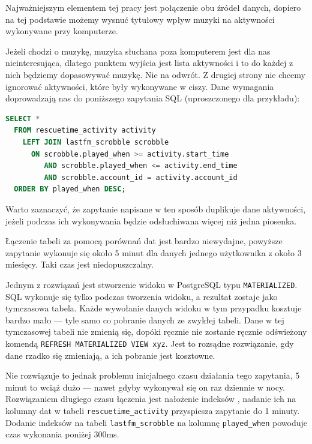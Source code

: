 \documentclass[brudnopis]{xmgr}
\begin{document}
        Najważniejszym elementem tej pracy jest połączenie obu źródeł danych,
        dopiero na tej podstawie możemy wysnuć tytułowy wpływ muzyki na aktywności wykonywane przy komputerze.

        Jeżeli chodzi o muzykę, muzyka słuchana poza komputerem jest dla nas nieinteresująca,
        dlatego punktem wyjścia jest lista aktywności i to do każdej z nich będziemy dopasowywać muzykę. Nie na odwrót.
        Z drugiej strony nie chcemy ignorować aktywności, które były wykonywane w ciszy.
        Dane wymagania doprowadzają nas do poniższego zapytania SQL (uproszczonego dla przykładu):

\begin{lstlisting}[language=sql]
SELECT *
  FROM rescuetime_activity activity
    LEFT JOIN lastfm_scrobble scrobble
      ON scrobble.played_when >= activity.start_time
         AND scrobble.played_when <= activity.end_time
         AND scrobble.account_id = activity.account_id
  ORDER BY played_when DESC;
\end{lstlisting}

        Warto zaznaczyć, że zapytanie napisane w ten sposób duplikuje dane aktywności,
        jeżeli podczas ich wykonywania będzie odsłuchiwana więcej niż jedna piosenka.

        Łączenie tabeli za pomocą porównań dat jest bardzo niewydajne,
        powyższe zapytanie wykonuje się około 5 minut dla danych jednego użytkownika z około 3 miesięcy.
        Taki czas jest niedopuszczalny.

        Jednym z rozwiązań jest stworzenie widoku w PostgreSQL typu \verb|MATERIALIZED|.
        SQL wykonuje się tylko podczas tworzenia widoku, a rezultat zostaje jako tymczasowa tabela.
        Każde wywołanie danych widoku w tym przypadku kosztuje bardzo mało --- tyle samo co pobranie danych ze zwykłej tabeli.
        Dane w tej tymczasowej tabeli nie zmienią się, dopóki ręcznie nie zostanie ręcznie odświeżony komendą
        \verb|REFRESH MATERIALIZED VIEW xyz|. Jest to rozsądne rozwiązanie, gdy dane rzadko się zmieniają, a ich pobranie jest kosztowne.

        Nie rozwiązuje to jednak problemu inicjalnego czasu działania tego zapytania,
        5 minut to wciąż dużo --- nawet gdyby wykonywał się on raz dziennie w nocy.
        Rozwiązaniem długiego czasu łączenia jest nałożenie indeksów \cite{postgresql:efficient-indexes},
        nadanie ich na kolumny dat w tabeli \verb|rescuetime_activity| przyspiesza zapytanie do 1 minuty.
        Dodanie indeksów na tabeli \verb|lastfm_scrobble| na kolumnę \verb|played_when| powoduje czas wykonania poniżej 300ms.
\end{document}
